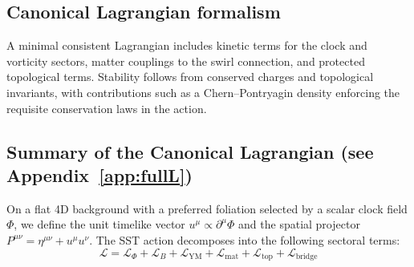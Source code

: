 \documentclass[10pt,reprint,aps,onecolumn,nofootinbib]{revtex4-2}
\begin{document}
        \subsection*{Canonical Lagrangian formalism}
            A minimal consistent Lagrangian includes kinetic terms for the clock and vorticity sectors, matter couplings to the swirl connection, and protected topological terms. Stability follows from conserved charges and topological invariants, with contributions such as a Chern–Pontryagin density enforcing the requisite conservation laws in the action.

        \subsection*{Summary of the Canonical Lagrangian (see Appendix~\ref{app:fullL})}
            On a flat 4D background with a preferred foliation selected by a scalar clock field \(\Phi\), we define the unit timelike vector \(u^\mu \propto \partial^\mu \Phi\) and the spatial projector \(P^{\mu\nu}=\eta^{\mu\nu}+u^\mu u^\nu\). The SST action decomposes into the following sectoral terms:
            \begin{equation}
                \mathcal{L} =
                \mathcal{L}_\Phi
                + \mathcal{L}_B
                + \mathcal{L}_{\mathrm{YM}}
                + \mathcal{L}_{\mathrm{mat}}
                + \mathcal{L}_{\mathrm{top}}
                + \mathcal{L}_{\mathrm{bridge}}
                \label{eq:L_summary}
            \end{equation}
\end{document}
